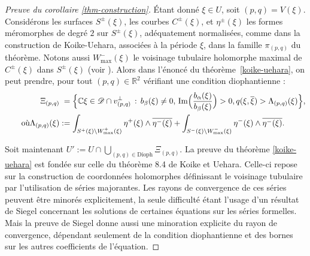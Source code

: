 \documentclass[JEP,XML,SOM,Unicode,francais,published]{cedram}
\newcommand{\R}{\mathbb{R}}
\newcommand{\C}{\mathbb{C}}
\theoremstyle{definition}
\begin{document}
\begin{proof}[Preuve du corollaire \ref{thm-construction}]
Étant donné $\xi \in U$, soit $(p, q) = V(\xi)$. Considérons les surfaces $S^{\pm}(\xi)$, les courbes $C^{\pm}(\xi)$, et $\eta^{\pm}(\xi)$ les formes méromorphes de degré $2$ sur $S^{\pm}(\xi)$, adéquatement normalisées, comme dans la construction de Koike-Uehara, associées à la période $\xi$, dans la famille $\pi_{(p, q)}$ du théorème. Notons aussi $W^{-}_{\text{max}}(\xi)$ le voisinage tubulaire holomorphe maximal de $C^{\pm}(\xi)$ dans $S^{\pm}(\xi)$ (voir \cite[lem.\,2.7]{koike2019gluing}). Alors dans l'énoncé du théorème~\ref{koike-uehara}, on peut prendre, pour tout $(p, q) \in \R^2$ vérifiant une condition diophantienne \cite[th.\,1.6, 6.2 \& 6.4]{koike2019gluing}:
\begin{align*}
\Xi_{(p, q)} &\hphantom{:}=\Bigl\{\C\xi \in \mathscr{D} \cap v_{(p, q)}^\perp\,:\,b_\beta(\xi) \neq 0,\,\mathrm{Im}\Bigl(\frac{b_{\alpha}(\xi)}{b_{\beta}(\xi)}\Bigr) >0, q(\xi,\overline{\xi}) > \Lambda_{(p, q)}(\xi)\Bigr\},\\
\tag*{où}
\Lambda_{(p, q)}(\xi)&:= \int_{S^{+}(\xi)\setminus W^{+}_{\text{max}}(\xi)} \eta^{+}(\xi)\wedge\overline{\eta^{-}(\xi)} + \int_{S^{-}(\xi)\setminus W^{-}_{\text{max}}(\xi)} \eta^{-}(\xi)\wedge\overline{\eta^{-}(\xi)}.
\end{align*}

Soit maintenant $U':= U \cap \bigcup_{(p, q) \in \mathrm{Dioph}} \Xi_{(p, q)}$.
La preuve du théorème \ref{koike-uehara} est fondée sur celle du théorème 8.4 de Koike et Uehara. Celle-ci repose sur la construction de coordonnées holomorphes définissant le voisinage tubulaire par l'utilisation de séries majorantes. Les rayons de convergence de ces séries peuvent être minorés explicitement, la seule difficulté étant l'usage d'un résultat de Siegel \cite{siegel1942iteration} concernant les solutions de certaines équations sur les séries formelles. Mais la preuve de Siegel donne aussi une minoration explicite du rayon de convergence, dépendant seulement de la condition diophantienne et des bornes sur les autres coefficients de l'équation.


\end{proof}
\end{document}
